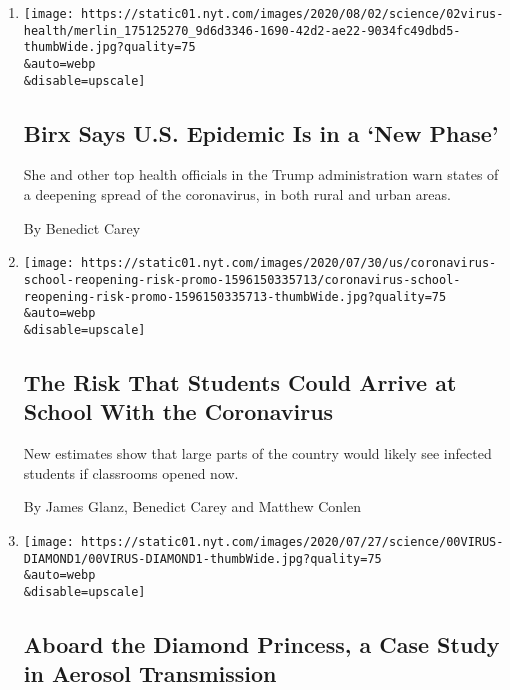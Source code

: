 \begin{enumerate}
\def\labelenumi{\arabic{enumi}.}
\item
  \href{/2020/08/02/health/dr-birx-coronavirus-phase.html}{}

  \texttt{[image: https://static01.nyt.com/images/2020/08/02/science/02virus-health/merlin\_175125270\_9d6d3346-1690-42d2-ae22-9034fc49dbd5-thumbWide.jpg?quality=75\\\&auto=webp\\\&disable=upscale]}

  \hypertarget{birx-says-us-epidemic-is-in-a-new-phase}{%
  \subsection{Birx Says U.S. Epidemic Is in a `New
  Phase'}\label{birx-says-us-epidemic-is-in-a-new-phase}}

  She and other top health officials in the Trump administration warn
  states of a deepening spread of the coronavirus, in both rural and
  urban areas.

  By Benedict Carey
\item
  \href{/interactive/2020/07/31/us/coronavirus-school-reopening-risk.html}{}

  \texttt{[image: https://static01.nyt.com/images/2020/07/30/us/coronavirus-school-reopening-risk-promo-1596150335713/coronavirus-school-reopening-risk-promo-1596150335713-thumbWide.jpg?quality=75\\\&auto=webp\\\&disable=upscale]}

  \hypertarget{the-risk-that-students-could-arrive-at-school-with-the-coronavirus}{%
  \subsection{The Risk That Students Could Arrive at School With the
  Coronavirus}\label{the-risk-that-students-could-arrive-at-school-with-the-coronavirus}}

  New estimates show that large parts of the country would likely see
  infected students if classrooms opened now.

  By James Glanz, Benedict Carey and Matthew Conlen
\item
  \href{/2020/07/30/health/diamond-princess-coronavirus-aerosol.html}{}

  \texttt{[image: https://static01.nyt.com/images/2020/07/27/science/00VIRUS-DIAMOND1/00VIRUS-DIAMOND1-thumbWide.jpg?quality=75\\\&auto=webp\\\&disable=upscale]}

  \hypertarget{aboard-the-diamond-princess-a-case-study-in-aerosol-transmission}{%
  \subsection{Aboard the Diamond Princess, a Case Study in Aerosol
  Transmission}\label{aboard-the-diamond-princess-a-case-study-in-aerosol-transmission}}


\end{enumerate}
